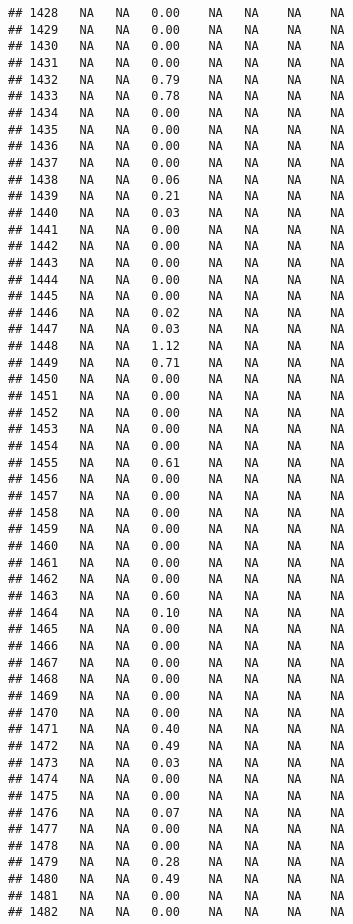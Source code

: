 \documentclass{article}\usepackage{graphicx, color}
\makeatletter
\newenvironment{kframe}{%
 \def\at@end@of@kframe{}%
 \ifinner\ifhmode%
  \def\at@end@of@kframe{\end{minipage}}%
  \begin{minipage}{\columnwidth}%
 \fi\fi%
 \def\FrameCommand##1{\hskip\@totalleftmargin \hskip-\fboxsep
 \colorbox{shadecolor}{##1}\hskip-\fboxsep
     \hskip-\linewidth \hskip-\@totalleftmargin \hskip\columnwidth}%
 \MakeFramed {\advance\hsize-\width
   \@totalleftmargin\z@ \linewidth\hsize
   \@setminipage}}%
 {\par\unskip\endMakeFramed%
 \at@end@of@kframe}
\newenvironment{knitrout}{}{} %
\makeatother
\begin{document}
\begin{knitrout}
\begin{kframe}
\begin{verbatim}
## 1428   NA   NA   0.00    NA   NA    NA    NA
## 1429   NA   NA   0.00    NA   NA    NA    NA
## 1430   NA   NA   0.00    NA   NA    NA    NA
## 1431   NA   NA   0.00    NA   NA    NA    NA
## 1432   NA   NA   0.79    NA   NA    NA    NA
## 1433   NA   NA   0.78    NA   NA    NA    NA
## 1434   NA   NA   0.00    NA   NA    NA    NA
## 1435   NA   NA   0.00    NA   NA    NA    NA
## 1436   NA   NA   0.00    NA   NA    NA    NA
## 1437   NA   NA   0.00    NA   NA    NA    NA
## 1438   NA   NA   0.06    NA   NA    NA    NA
## 1439   NA   NA   0.21    NA   NA    NA    NA
## 1440   NA   NA   0.03    NA   NA    NA    NA
## 1441   NA   NA   0.00    NA   NA    NA    NA
## 1442   NA   NA   0.00    NA   NA    NA    NA
## 1443   NA   NA   0.00    NA   NA    NA    NA
## 1444   NA   NA   0.00    NA   NA    NA    NA
## 1445   NA   NA   0.00    NA   NA    NA    NA
## 1446   NA   NA   0.02    NA   NA    NA    NA
## 1447   NA   NA   0.03    NA   NA    NA    NA
## 1448   NA   NA   1.12    NA   NA    NA    NA
## 1449   NA   NA   0.71    NA   NA    NA    NA
## 1450   NA   NA   0.00    NA   NA    NA    NA
## 1451   NA   NA   0.00    NA   NA    NA    NA
## 1452   NA   NA   0.00    NA   NA    NA    NA
## 1453   NA   NA   0.00    NA   NA    NA    NA
## 1454   NA   NA   0.00    NA   NA    NA    NA
## 1455   NA   NA   0.61    NA   NA    NA    NA
## 1456   NA   NA   0.00    NA   NA    NA    NA
## 1457   NA   NA   0.00    NA   NA    NA    NA
## 1458   NA   NA   0.00    NA   NA    NA    NA
## 1459   NA   NA   0.00    NA   NA    NA    NA
## 1460   NA   NA   0.00    NA   NA    NA    NA
## 1461   NA   NA   0.00    NA   NA    NA    NA
## 1462   NA   NA   0.00    NA   NA    NA    NA
## 1463   NA   NA   0.60    NA   NA    NA    NA
## 1464   NA   NA   0.10    NA   NA    NA    NA
## 1465   NA   NA   0.00    NA   NA    NA    NA
## 1466   NA   NA   0.00    NA   NA    NA    NA
## 1467   NA   NA   0.00    NA   NA    NA    NA
## 1468   NA   NA   0.00    NA   NA    NA    NA
## 1469   NA   NA   0.00    NA   NA    NA    NA
## 1470   NA   NA   0.00    NA   NA    NA    NA
## 1471   NA   NA   0.40    NA   NA    NA    NA
## 1472   NA   NA   0.49    NA   NA    NA    NA
## 1473   NA   NA   0.03    NA   NA    NA    NA
## 1474   NA   NA   0.00    NA   NA    NA    NA
## 1475   NA   NA   0.00    NA   NA    NA    NA
## 1476   NA   NA   0.07    NA   NA    NA    NA
## 1477   NA   NA   0.00    NA   NA    NA    NA
## 1478   NA   NA   0.00    NA   NA    NA    NA
## 1479   NA   NA   0.28    NA   NA    NA    NA
## 1480   NA   NA   0.49    NA   NA    NA    NA
## 1481   NA   NA   0.00    NA   NA    NA    NA
## 1482   NA   NA   0.00    NA   NA    NA    NA

\end{verbatim}
\end{kframe}
\end{knitrout}
\end{document}
